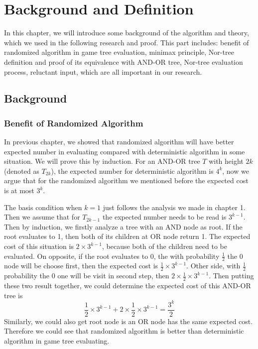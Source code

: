 \chapter{Background and Definition} 

In this chapter, we will introduce some background of the algorithm and theory, which we used in the following research and proof. This part includes: benefit of randomized algorithm in game tree evaluation, minimax principle, Nor-tree definition and proof of its equivalence with AND-OR tree, Nor-tree evaluation process, reluctant input, which are all important in our research.


\section{Background}
\subsection{Benefit of Randomized Algorithm}
In previous chapter, we showed that randomized algorithm will have better expected number in evaluating compared with deterministic algorithm in some situation. We will prove this by induction. For an AND-OR tree $T$ with height $2k$(denoted as $T_{2k}$), the expected number for deterministic algorithm is $4^k$, now we argue that for the randomized algorithm we mentioned before the expected cost is at most $3^k$.

The basis condition when $k = 1$ just follows the analysis we made in chapter 1. Then we assume that for $T_{2k-1}$ the expected number needs to be read is $3^{k-1}$. Then by induction, we firstly analyze a tree with an AND node as root. If the root evaluates to 1, then both of its children at OR node return 1. The expected cost of this situation is $2 \times 3^{k-1}$, because both of the children need to be evaluated. On opposite, if the root evaluates to 0, the with probability $\frac{1}{2}$ the $0$ node will be choose first, then the expected cost is $\frac{1}{2} \times 3^{k-1}$. Other side, with $\frac{1}{2}$ probability the 0 one will be visit in second step, then $2\times \frac{1}{2} \times 3^{k-1}$. Then putting these two result together, we could determine the expected cost of this AND-OR tree is
\begin{equation}
	\frac{1}{2} \times 3^{k-1}+2\times \frac{1}{2} \times 3^{k-1}=\frac{3^k}{2}
\end{equation}
Similarly, we could also get root node is an OR node has the same expected cost. Therefore we could see that randomized algorithm is better than deterministic algorithm in game tree evaluating.  

